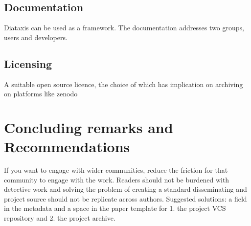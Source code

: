 \subsection{Documentation}
Diataxis can be used as a framework. The documentation addresses two groups, users and developers. 

\subsection{Licensing}
A suitable open source licence, the choice of which has implication on archiving on platforms like zenodo

\section{Concluding remarks and Recommendations}

If you want to engage with wider communities, reduce the friction for that community to engage with the work.
Readers should not be burdened with detective work and solving the problem of creating a standard disseminating and project source should not be replicate across authors.
Suggested solutions: a field in the metadata and a space in the paper template for 1. the project VCS repository and 2. the project archive.
